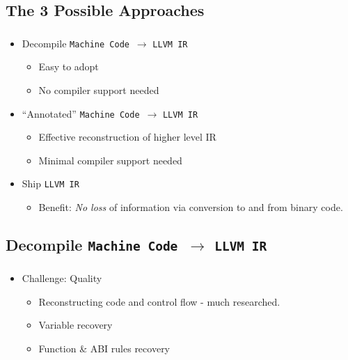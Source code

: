 \documentclass[mathserif,10pt]{beamer}
\newcommand{\cmt}[1]{}
\newcommand{\LIR}{{\tt LLVM IR}}
\newcommand{\MC}{{\tt Machine Code}}
\begin{document}
  \subsection{The 3 Possible Approaches}
  \frame
  {
    \frametitle{\subsecname}
    \begin{itemize}
      \item Decompile \MC \ $\rightarrow$ \LIR
        \begin{itemize}
          \item Easy to adopt
          \item No compiler support needed
        \end{itemize}
      \item ``Annotated'' \MC \ $\rightarrow$ \LIR
        \begin{itemize}
          \item Effective reconstruction of higher level IR
          \item Minimal compiler support needed
        \end{itemize}
      \item Ship \LIR
        \begin{itemize}
          \item Benefit:  \emph{No loss} of information via conversion to and from binary code.
        \end{itemize}
    \end{itemize}

  }

  \subsection{Decompile \MC \ $\rightarrow$ \LIR}
  \frame
  {
    \frametitle{\subsecname}
    \begin{itemize}
      \item Challenge: Quality     
      \begin{itemize}
        \item Reconstructing code and control flow - much researched.
        \item Variable recovery
        \item Function \& ABI rules recovery
      \end{itemize}
    \end{itemize}

    \cmt{
        These methods make various trade-offs between ease of adoption, binary size,
        ease of shipping, and quality of the resulting LLVMIR, which directly
          affects the benefits that allvm provides.

          \item Diffrentiate data \& code.
          \item Indirect branch/call.
          \item Variable instruction size
          \item Position independent code (PIC) sequences
          \item Hand crafted assembly code
    }
  }
\end{document}
